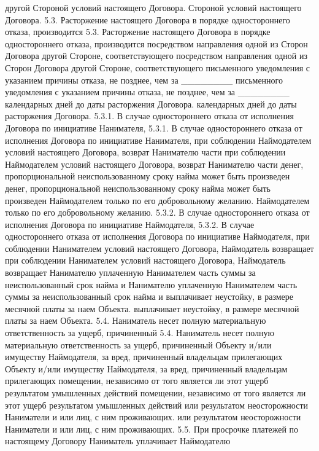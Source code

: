 другой
Стороной условий настоящего Договора.
Стороной условий настоящего Договора.
5.3. Расторжение настоящего Договора в порядке одностороннего отказа,
производится
5.3. Расторжение настоящего Договора в порядке одностороннего отказа,
производится
посредством направления одной из Сторон Договора другой Стороне,
соответствующего
посредством направления одной из Сторон Договора другой Стороне,
соответствующего
письменного уведомления с указанием причины отказа, не позднее, чем за ________
письменного уведомления с указанием причины отказа, не позднее, чем за ________
календарных дней до даты расторжения Договора.
календарных дней до даты расторжения Договора.
5.3.1. В случае одностороннего отказа от исполнения Договора по инициативе
Нанимателя,
5.3.1. В случае одностороннего отказа от исполнения Договора по инициативе
Нанимателя,
при соблюдении Наймодателем условий настоящего Договора, возврат Нанимателю
части
при соблюдении Наймодателем условий настоящего Договора, возврат Нанимателю
части
денег, пропорциональной неиспользованному сроку найма может быть произведен
денег, пропорциональной неиспользованному сроку найма может быть произведен
Наймодателем только по его добровольному желанию.
Наймодателем только по его добровольному желанию.
5.3.2. В случае одностороннего отказа от исполнения Договора по инициативе
Наймодателя,
5.3.2. В случае одностороннего отказа от исполнения Договора по инициативе
Наймодателя,
при соблюдении Нанимателем условий настоящего Договора, Наймодатель возвращает
при соблюдении Нанимателем условий настоящего Договора, Наймодатель возвращает
Нанимателю уплаченную Нанимателем часть суммы за неиспользованный срок найма и
Нанимателю уплаченную Нанимателем часть суммы за неиспользованный срок найма и
выплачивает неустойку, в размере месячной платы за наем Объекта.
выплачивает неустойку, в размере месячной платы за наем Объекта.
5.4. Наниматель несет полную материальную ответственность за ущерб, причиненный
5.4. Наниматель несет полную материальную ответственность за ущерб, причиненный
Объекту и/или имуществу Наймодателя, за вред, причиненный владельцам прилегающих
Объекту и/или имуществу Наймодателя, за вред, причиненный владельцам прилегающих
помещении, независимо от того является ли этот ущерб результатом умышленных
действий
помещении, независимо от того является ли этот ущерб результатом умышленных
действий
или результатом неосторожности Наниматели и или лиц, с ним проживающих.
или результатом неосторожности Наниматели и или лиц, с ним проживающих.
5.5. При просрочке платежей по настоящему Договору Наниматель уплачивает
Наймодателю
